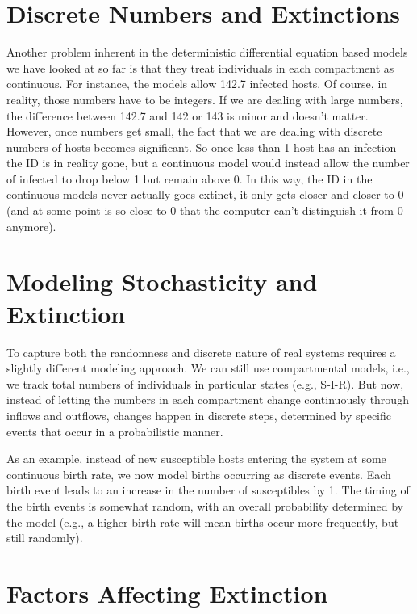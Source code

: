 \documentclass[]{book}
\theoremstyle{definition}
\theoremstyle{definition}
\theoremstyle{definition}
\theoremstyle{remark}
\begin{document}
\section{Discrete Numbers and
Extinctions}\label{discrete-numbers-and-extinctions}

Another problem inherent in the deterministic differential equation
based models we have looked at so far is that they treat individuals in
each compartment as continuous. For instance, the models allow 142.7
infected hosts. Of course, in reality, those numbers have to be
integers. If we are dealing with large numbers, the difference between
142.7 and 142 or 143 is minor and doesn't matter. However, once numbers
get small, the fact that we are dealing with discrete numbers of hosts
becomes significant. So once less than 1 host has an infection the ID is
in reality gone, but a continuous model would instead allow the number
of infected to drop below 1 but remain above 0. In this way, the ID in
the continuous models never actually goes extinct, it only gets closer
and closer to 0 (and at some point is so close to 0 that the computer
can't distinguish it from 0 anymore).

\section{Modeling Stochasticity and
Extinction}\label{modeling-stochasticity-and-extinction}

To capture both the randomness and discrete nature of real systems
requires a slightly different modeling approach. We can still use
compartmental models, i.e., we track total numbers of individuals in
particular states (e.g., S-I-R). But now, instead of letting the numbers
in each compartment change continuously through inflows and outflows,
changes happen in discrete steps, determined by specific events that
occur in a probabilistic manner.

As an example, instead of new susceptible hosts entering the system at
some continuous birth rate, we now model births occurring as discrete
events. Each birth event leads to an increase in the number of
susceptibles by 1. The timing of the birth events is somewhat random,
with an overall probability determined by the model (e.g., a higher
birth rate will mean births occur more frequently, but still randomly).

\section{Factors Affecting
Extinction}\label{factors-affecting-extinction}
\end{document}
